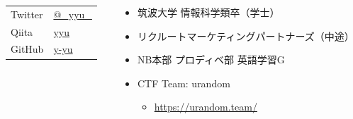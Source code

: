 \begin{frame}
\begin{columns}
\begin{column}{0.4\textwidth}
      \begin{table}[h]
        \begin{tabular}{ll}
          Twitter & \href{https://twitter.com/\_yyu\_}{@\_yyu\_} \\
          Qiita &  \href{https://qiita.com/yyu}{yyu} \\
          GitHub &  \href{https://github.com/y-yu}{y-yu} \\
        \end{tabular}
      \end{table}
    \end{column}
    \begin{column}{0.6\textwidth}
      \begin{itemize}
        \item<2-> 筑波大学 情報科学類卒（学士）
        \item<3-> リクルートマーケティングパートナーズ（中途）
        \item<4-> NB本部 プロディベ部 英語学習G
        \item<5-> CTF Team: urandom
        \begin{itemize}
          \item \url{https://urandom.team/}
        \end{itemize}
      \end{itemize}
    \end{column}
  \end{columns}
\end{frame}

